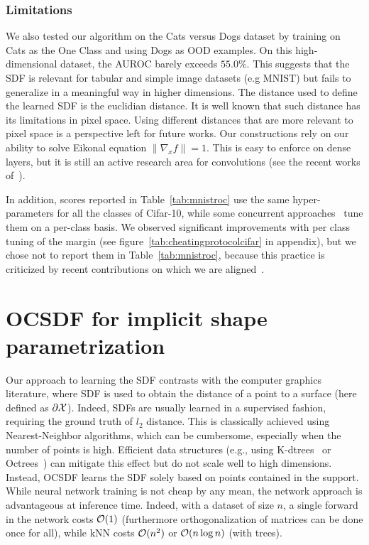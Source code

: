 \subsubsection{Limitations}

We also tested our algorithm on the Cats versus Dogs dataset by training on Cats as the One Class and using Dogs as OOD examples. On this high-dimensional dataset, the AUROC barely exceeds $55.0\%$. This suggests that the SDF is relevant for tabular and simple image datasets (e.g MNIST) but fails to generalize in a meaningful way in higher dimensions. The distance used to define the learned SDF is the euclidian distance. It is well known that such distance has its limitations in pixel space. Using different distances that are more relevant to pixel space is a perspective left for future works.  Our constructions rely on our ability to solve Eikonal equation $\|\nabla_x f\|=1$. This is easy to enforce on dense layers, but it is still an active research area for convolutions (see the recent works of~\cite{achour2021existence,singlaimproved2022,xulot2022}).  

In addition, scores reported in Table~\ref{tab:mnistroc} use the same hyper-parameters for all the classes of Cifar-10, while some concurrent approaches~\cite{goyal_drocc_2020} tune them on a per-class basis. We observed significant improvements with per class tuning of the margin (see figure~\ref{tab:cheatingprotocolcifar} in appendix), but we chose not to report them in Table~\ref{tab:mnistroc}, because this practice is criticized by recent contributions on which we are aligned~\cite{han_adbench_nodate,dinghyperparameter2022}.





\section{OCSDF for implicit shape parametrization}
Our approach to learning the SDF contrasts with the computer graphics literature, where SDF is used to obtain the distance of a point to a surface (here defined as $\partial\mathcal{X}$). Indeed, SDFs are usually learned in a supervised fashion, requiring the ground truth of $l_2$ distance. This is classically achieved using Nearest-Neighbor algorithms, which can be cumbersome, especially when the number of points is high. Efficient data structures (e.g., using K-dtrees~\cite{maneewongvatana1999analysis} or Octrees~\cite{meagher1980octree}) can mitigate this effect but do not scale well to high dimensions. Instead, OCSDF learns the SDF solely based on points contained in the support.  While neural network training is not cheap by any mean, the network approach is advantageous at inference time. Indeed, with a dataset of size $n$, a single forward in the network costs $\mathcal{O}(1)$ (furthermore orthogonalization of matrices can be done once for all), while kNN costs $\mathcal{O}(n^2)$ or $\mathcal{O}(n\log{n})$ (with trees).

